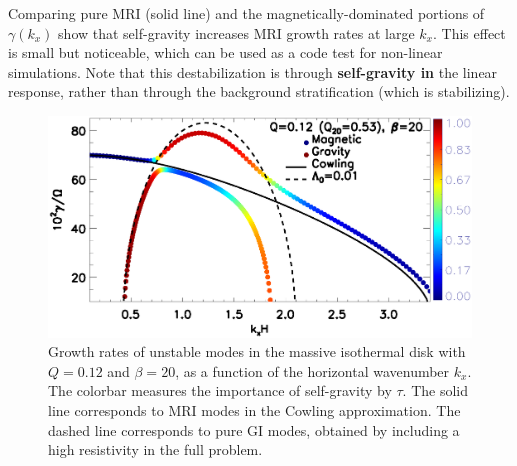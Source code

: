 Comparing pure MRI (solid line) and the magnetically-dominated
portions of $\gamma(k_x)$ show that self-gravity increases MRI growth
rates at large $k_x$. This effect is small but noticeable, which can
be used as a code test for non-linear simulations. Note that this
destabilization is through {\bf self-gravity in} the linear response, rather 
than through the background stratification (which is stabilizing).  


\begin{figure}
  \includegraphics[width=\linewidth]{figures/compare_growth3_Q0d12_B20.ps}  
  \caption{Growth rates of unstable modes in the massive isothermal
    disk with $Q=0.12$ and $\beta=20$, as a function of the horizontal
    wavenumber $k_x$. The colorbar measures the importance of
    self-gravity by $\tau$. The solid line corresponds to MRI modes in the
    Cowling approximation. The dashed line corresponds to pure GI
    modes, obtained by including a high resistivity in the full
    problem. 
    \label{compare_growth3_Q01d2}}
\end{figure}

